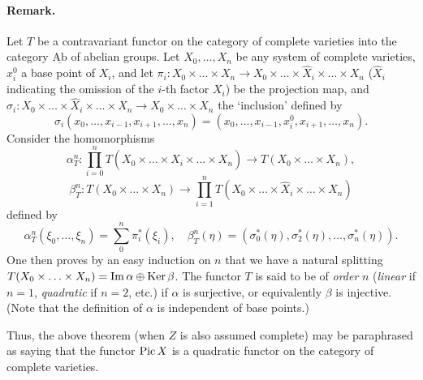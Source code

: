 \paragraph{Remark.}
Let $T$ be a contravariant functor on the category of
complete varieties into the category $\underline{\mathrm{Ab}}$ of abelian
groups. Let $X_0, \ldots, X_n$ be any system of complete varieties, $x_i^0$ a
base point of $X_i$, and let
$\pi_i : X_0 \times \ldots \times X_n \to
 X_0 \times \ldots \times \hat{X}_i \times \ldots \times X_n$
($\hat{X}_i$ indicating the omission of the $i$-th factor $X_i$) be the
projection map, and
$\sigma_i : X_0 \times \ldots \times \hat{X}_i \times \ldots \times X_n \to
 X_0 \times \ldots \times X_n$
the `inclusion' defined by
\[
  \sigma_i(x_0, \ldots, x_{i-1}, x_{i+1}, \ldots, x_n) =
  (x_0, \ldots, x_{i-1}, x_i^0, x_{i+1}, \ldots, x_n).
\]
Consider the homomorphisms
\[
  \alpha_T^n : \prod_{i=0}^{n}
  T(X_0 \times \ldots \times \hat{X}_i \times \ldots \times X_n) \to
  T(X_0 \times \ldots \times X_n),
\]
\[
  \beta_T^n : T(X_0 \times \ldots \times X_n) \to \prod_{i=1}^{n}
  T(X_0 \times \ldots \times \hat{X}_i \times \ldots \times X_n)
\]
defined by
\[
  \alpha_T^n(\xi_0, \ldots, \xi_n) = \sum_0^n \pi_i^*(\xi_i), \quad
  \beta_T^n(\eta) = (\sigma_0^*(\eta), \sigma_2^*(\eta), \ldots, \sigma_n^*(\eta)).
\]
One then proves by an easy induction on $n$ that we have a natural splitting
$T(X_0 \times \ldots \times X_n) = \operatorname{Im} \alpha \oplus \operatorname{Ker} \beta$. The
functor $T$ is said to be of \textit{order} $n$ (\textit{linear} if $n = 1$,
\textit{quadratic} if $n = 2$, etc.) if $\alpha$ is surjective, or
equivalently $\beta$ is injective. (Note that the definition of $\alpha$ is
independent of base points.)

Thus, the above theorem (when $Z$ is also assumed complete) may be
paraphrased as saying that the functor $\operatorname{Pic} X$ is a quadratic functor on the
category of complete varieties.
